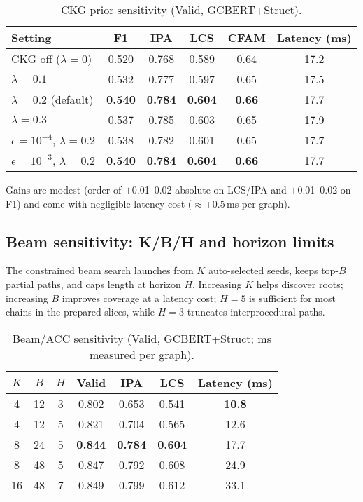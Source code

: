 \documentclass{buthesis}
\begin{document}
\begin{table}[H]
\centering
\small
\setlength{\tabcolsep}{6pt}
\renewcommand{\arraystretch}{1.10}
\caption{CKG prior sensitivity (Valid, GCBERT{+}Struct).}
\label{tab:ablate-ckg}
\begin{tabular}{l c c c c c}
\toprule
\textbf{Setting} & F1 & IPA & LCS & CFAM & Latency (ms) \\
\midrule
CKG off ($\lambda{=}0$)            & 0.520 & 0.768 & 0.589 & 0.64 & 17.2 \\
$\lambda{=}0.1$                    & 0.532 & 0.777 & 0.597 & 0.65 & 17.5 \\
$\lambda{=}0.2$ (default)          & \textbf{0.540} & \textbf{0.784} & \textbf{0.604} & \textbf{0.66} & 17.7 \\
$\lambda{=}0.3$                    & 0.537 & 0.785 & 0.603 & 0.65 & 17.9 \\
\midrule
$\epsilon{=}10^{-4}$, $\lambda{=}0.2$ & 0.538 & 0.782 & 0.601 & 0.65 & 17.7 \\
$\epsilon{=}10^{-3}$, $\lambda{=}0.2$ & \textbf{0.540} & \textbf{0.784} & \textbf{0.604} & \textbf{0.66} & 17.7 \\
\bottomrule
\end{tabular}
\end{table}

\noindent Gains are modest (order of $+$0.01--0.02 absolute on LCS/IPA and $+$0.01--0.02 on F1) and come with negligible latency cost ($\approx$+$0.5$\,ms per graph).

\subsection{Beam sensitivity: K/B/H and horizon limits}
\label{subsec:ablate-beam}

The constrained beam search launches from $K$ auto-selected seeds, keeps top-$B$ partial paths, and caps length at horizon $H$. Increasing $K$ helps discover roots; increasing $B$ improves coverage at a latency cost; $H{=}5$ is sufficient for most chains in the prepared slices, while $H{=}3$ truncates interprocedural paths.

\begin{table}[H]
\centering
\small
\setlength{\tabcolsep}{5pt}
\renewcommand{\arraystretch}{1.10}
\caption{Beam/ACC sensitivity (Valid, GCBERT{+}Struct; ms measured per graph).}
\label{tab:ablate-beam}
\begin{tabular}{c c c c c c c}
\toprule
$K$ & $B$ & $H$ & Valid & IPA & LCS & Latency (ms) \\
\midrule
4  & 12 & 3 & 0.802 & 0.653 & 0.541 & \textbf{10.8} \\
4  & 12 & 5 & 0.821 & 0.704 & 0.565 & 12.6 \\
8  & 24 & 5 & \textbf{0.844} & \textbf{0.784} & \textbf{0.604} & 17.7 \\
8  & 48 & 5 & 0.847 & 0.792 & 0.608 & 24.9 \\
16 & 48 & 7 & 0.849 & 0.799 & 0.612 & 33.1 \\
\bottomrule
\end{tabular}
\end{table}
\end{document}
